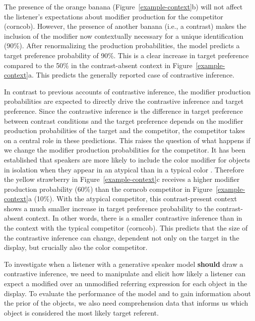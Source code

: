 \documentclass[10pt,letterpaper]{article}
\begin{document}
The presence of the orange banana (Figure~\ref{example-context}b) will not affect the listener's expectations about modifier production for the competitor (corncob). However, the presence of another banana (i.e., a contrast) makes the inclusion of the modifier now contextually necessary for a unique identification (90\%). After renormalizing the production probabilities, the model predicts a target preference probability of 90\%. This is a clear increase in target preference compared to the 50\% in the contrast-absent context in Figure~\ref{example-context}a. This predicts the generally reported case of contrastive inference.

In contrast to previous accounts of contrastive inference, the modifier production probabilities are expected to directly drive the contrastive inference and target preference. Since the contrastive inference is the difference in target preference between contrast conditions and the target preference depends on the modifier production probabilities of the target and the competitor, the competitor takes on a central role in these predictions. This raises the question of what happens if we change the modifier production probabilities for the competitor. It has been established that speakers are more likely to include the color modifier for objects in isolation when they appear in an atypical than in a typical color \cite{Rubio-Fernandez:2016,Westerbeek:2015}. Therefore the yellow strawberry in Figure~\ref{example-context}c receives a higher modifier production probability (60\%) than the corncob competitor in Figure~\ref{example-context}a (10\%). With the atypical competitor, this contrast-present context shows a much smaller increase in target preference probability to the contrast-absent context. In other words, there is a smaller contrastive inference than in the context with the typical competitor (corncob). This predicts that the size of the contrastive inference can change, dependent not only on the target in the display, but crucially also the color competitor. 

To investigate when a listener with a generative speaker model \textbf{should} draw a contrastive inference, we need to manipulate and elicit how likely a listener can expect a modified over an unmodified referring expression for each object in the display. To evaluate the performance of the model and to gain information about the prior of the objects, we also need comprehension data that informs us which object is considered the most likely target referent.
\end{document}
